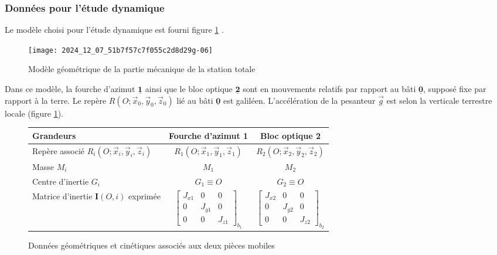 \subsubsection{Données pour l'étude dynamique}
Le modèle choisi pour l'étude dynamique est fourni figure \ref{CCS_MP_2017:fig_09} .\\


\begin{figure}[!h]
\centering
\texttt{[image: 2024\_12\_07\_51b7f57c7f055c2d8d29g-06]}

\caption{Modèle géométrique de la partie mécanique de la station totale \label{CCS_MP_2017:fig_09}}
\end{figure}

Dans ce modèle, la fourche d'azimut $\underline{\mathbf{1}}$ ainsi que le bloc optique $\underline{\mathbf{2}}$ sont en mouvements relatifs par rapport au bâti $\underline{\mathbf{0}}$, supposé fixe par rapport à la terre. Le repère $R\left(O ; \vec{x}_{0}, \vec{y}_{0}, \vec{z}_{0}\right)$ lié au bâti $\underline{\mathbf{0}}$ est galiléen. L'accélération de la pesanteur $\vec{g}$ est selon la verticale terrestre locale (figure \ref{CCS_MP_2017:fig_09}).

\begin{figure}[!h]
\centering
\begin{tabular}{|l|c|c|}
\hline
Grandeurs & Fourche d'azimut 1 & Bloc optique 2 \\
\hline
Repère associé $R_{i}\left(O ; \vec{x}_{i}, \vec{y}_{i}, \vec{z}_{i}\right)$ & $R_{1}\left(O ; \vec{x}_{1}, \vec{y}_{1}, \vec{z}_{1}\right)$ & $R_{2}\left(O ; \vec{x}_{2}, \vec{y}_{2}, \vec{z}_{2}\right)$ \\
\hline
Masse $M_{i}$ & $M_{1}$ & $M_{2}$ \\
\hline
Centre d'inertie $G_{i}$ & $G_{1} \equiv O$ & $G_{2} \equiv O$ \\
\hline
Matrice d'inertie $\mathbf{I}(O, i)$ exprimée & $\left[\begin{array}{ccc}J_{x 1} & 0 & 0 \\ 0 & J_{y 1} & 0 \\ 0 & 0 & J_{z 1}\end{array}\right]_{b_{1}}$ & $\left[\begin{array}{ccc}J_{x 2} & 0 & 0 \\ 0 & J_{y 2} & 0 \\ 0 & 0 & J_{z 2}\end{array}\right]_{b_{2}}$ \\
\hline
\end{tabular}
\caption{Données géométriques et cinétiques associés aux deux pièces mobiles \label{CCS_MP_2017:fig_10}}
\end{figure}


